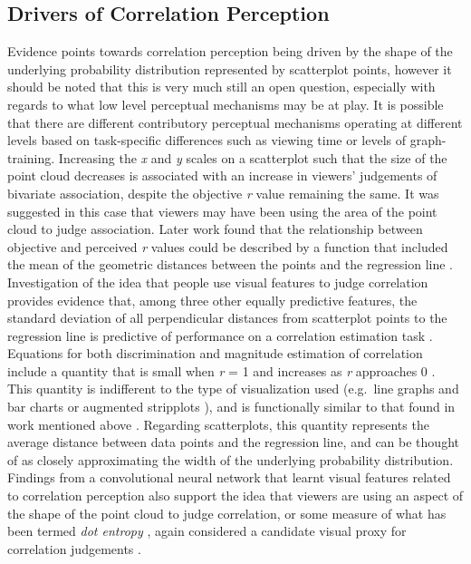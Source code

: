 \documentclass[manuscript, review, anonymous, screen]{acmart}
\begin{document}
\hypertarget{sec-drivers}{%
\subsection{Drivers of Correlation Perception}\label{sec-drivers}}

Evidence points towards correlation perception being driven by the shape
of the underlying probability distribution represented by scatterplot
points, however it should be noted that this is very much still an open
question, especially with regards to what low level perceptual
mechanisms may be at play. It is possible that there are different
contributory perceptual mechanisms operating at different levels based
on task-specific differences such as viewing time or levels of
graph-training. Increasing the \emph{x} and \emph{y} scales on a
scatterplot such that the size of the point cloud decreases
\citep{cleveland_1982} is associated with an increase in viewers'
judgements of bivariate association, despite the objective \emph{r}
value remaining the same. It was suggested in this case that viewers may
have been using the area of the point cloud to judge association. Later
work found that the relationship between objective and perceived
\emph{r} values could be described by a function that included the mean
of the geometric distances between the points and the regression line
\citep{meyer_1997}. Investigation of the idea that people use visual
features to judge correlation provides evidence that, among three other
equally predictive features, the standard deviation of all perpendicular
distances from scatterplot points to the regression line is predictive
of performance on a correlation estimation task \citep{yang_2019}.
Equations for both discrimination and magnitude estimation of
correlation include a quantity that is small when \emph{r} = 1 and
increases as \emph{r} approaches 0 \citep{rensink_2017}. This quantity
is indifferent to the type of visualization used (e.g.~line graphs and
bar charts \citep{harrison_2014} or augmented stripplots
\citep{rensink_2017}), and is functionally similar to that found in work
mentioned above \citep{cleveland_1982, meyer_1997, yang_2019}. Regarding
scatterplots, this quantity represents the average distance between data
points and the regression line, and can be thought of as closely
approximating the width of the underlying probability distribution.
Findings from a convolutional neural network that learnt visual features
related to correlation perception also support the idea that viewers are
using an aspect of the shape of the point cloud to judge correlation, or
some measure of what has been termed \emph{dot entropy}
\citep{yang_2023}, again considered a candidate visual proxy for
correlation judgements \citep{rensink_2017, rensink_2022}.
\end{document}
